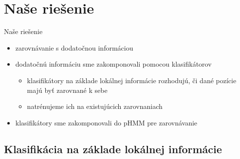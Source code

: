 \documentclass[xcolor=dvipsnames, compress, 12pt]{beamer}
\theoremstyle{definition}
\begin{document}

\section{Naše riešenie}
\begin{frame}{Naše riešenie}
  \begin{itemize}
    \item zarovnávanie s dodatočnou informáciou
    \item dodatočnú informáciu sme zakomponovali pomocou klasifikátorov
    \begin{itemize}
      \item klasifikátory na základe lokálnej informácie rozhodujú, či dané pozície majú byť zarovnané k sebe
      \item natrénujeme ich na existujúcich zarovnaniach
    \end{itemize}
    \item klasifikátory sme zakomponovali do pHMM pre zarovnávanie
  \end{itemize}
\end{frame}


\subsection{Klasifikácia na základe lokálnej informácie}
\end{document}

